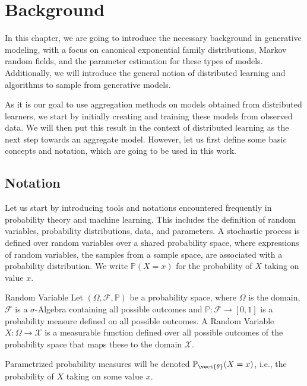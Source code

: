 \chapter{Background}
\label{chapter:kap2}
In this chapter, we are going to introduce the necessary background in generative modeling, with a focus on canonical exponential family distributions, Markov random fields, and the parameter estimation for these types of models.
Additionally, we will introduce the general notion of distributed learning and algorithms to sample from generative models.

As it is our goal to use aggregation methods on models obtained from distributed learners, we start by initially creating and training these models from observed data. 
We will then put this result in the context of distributed learning as the next step towards an aggregate model.
However, let us first define some basic concepts and notation, which are going to be used in this work.


\section{Notation}
    \label{sec:nota}
    Let us start by introducing tools and notations encountered frequently in probability theory and machine learning.
    This includes the definition of random variables, probability distributions, data, and parameters.
    A stochastic process is defined over random variables over a shared probability space, where expressions of random variables, the samples from a sample space, are associated with a probability distribution. 
    We write $\mathbb{P}(X = x)$ for the probability of $X$ taking on value $x$.
    \begin{definition}{Random Variable}
        \label{def:randvar}
        Let $(\Omega, \mathcal{F}, \mathbb{P})$ be a probability space, where $\Omega$ is the domain, $\mathcal{F}$ is a $\sigma$-Algebra containing all possible outcomes and $\mathbb{P}: \mathcal{F} \rightarrow [0,1]$ is a probability measure defined on all possible outcomes.
        A Random Variable $X: \Omega \rightarrow \mathcal{X}$ is a measurable function defined over all possible outcomes of the probability space that maps these to the domain $\mathcal{X}$.

        Parametrized probability measures will be denoted $\mathbb{P}_{\vect{\theta}} (X = x)$, i.e., the probability of $X$ taking on some value $x$.
    \end{definition}


